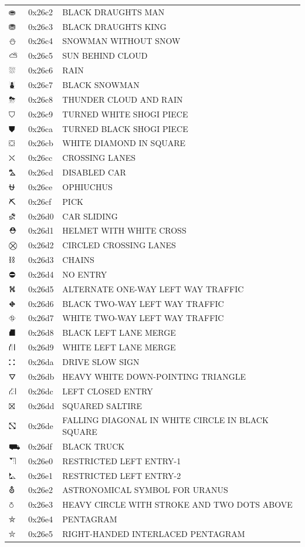 \documentclass[12pt, twoside]{article}
\begin{document}
\begin{longtable}{L{1.0cm} L{2.0cm} >{\footnotesize}L{10cm}}
$⛂$&0x26c2&BLACK DRAUGHTS MAN\\
$⛃$&0x26c3&BLACK DRAUGHTS KING\\
$⛄$&0x26c4&SNOWMAN WITHOUT SNOW\\
$⛅$&0x26c5&SUN BEHIND CLOUD\\
$⛆$&0x26c6&RAIN\\
$⛇$&0x26c7&BLACK SNOWMAN\\
$⛈$&0x26c8&THUNDER CLOUD AND RAIN\\
$⛉$&0x26c9&TURNED WHITE SHOGI PIECE\\
$⛊$&0x26ca&TURNED BLACK SHOGI PIECE\\
$⛋$&0x26cb&WHITE DIAMOND IN SQUARE\\
$⛌$&0x26cc&CROSSING LANES\\
$⛍$&0x26cd&DISABLED CAR\\
$⛎$&0x26ce&OPHIUCHUS\\
$⛏$&0x26cf&PICK\\
$⛐$&0x26d0&CAR SLIDING\\
$⛑$&0x26d1&HELMET WITH WHITE CROSS\\
$⛒$&0x26d2&CIRCLED CROSSING LANES\\
$⛓$&0x26d3&CHAINS\\
$⛔$&0x26d4&NO ENTRY\\
$⛕$&0x26d5&ALTERNATE ONE-WAY LEFT WAY TRAFFIC\\
$⛖$&0x26d6&BLACK TWO-WAY LEFT WAY TRAFFIC\\
$⛗$&0x26d7&WHITE TWO-WAY LEFT WAY TRAFFIC\\
$⛘$&0x26d8&BLACK LEFT LANE MERGE\\
$⛙$&0x26d9&WHITE LEFT LANE MERGE\\
$⛚$&0x26da&DRIVE SLOW SIGN\\
$⛛$&0x26db&HEAVY WHITE DOWN-POINTING TRIANGLE\\
$⛜$&0x26dc&LEFT CLOSED ENTRY\\
$⛝$&0x26dd&SQUARED SALTIRE\\
$⛞$&0x26de&FALLING DIAGONAL IN WHITE CIRCLE IN BLACK SQUARE\\
$⛟$&0x26df&BLACK TRUCK\\
$⛠$&0x26e0&RESTRICTED LEFT ENTRY-1\\
$⛡$&0x26e1&RESTRICTED LEFT ENTRY-2\\
$⛢$&0x26e2&ASTRONOMICAL SYMBOL FOR URANUS\\
$⛣$&0x26e3&HEAVY CIRCLE WITH STROKE AND TWO DOTS ABOVE\\
$⛤$&0x26e4&PENTAGRAM\\
$⛥$&0x26e5&RIGHT-HANDED INTERLACED PENTAGRAM\\

\end{longtable}
\end{document}
